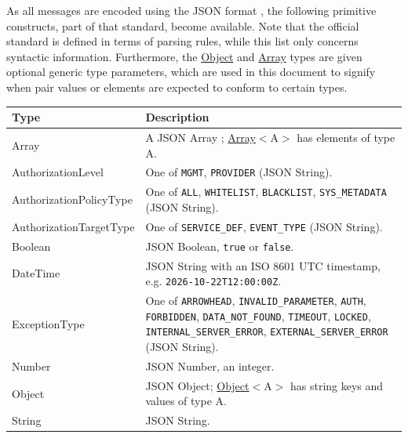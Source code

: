 \documentclass[a4paper]{arrowhead}
\newcommand{\pdef}[1]{{\textcolor{ArrowheadGrey}{#1 \label{sec:model:primitives:#1} \label{sec:model:primitives:#1s}}}}
\newcommand{\pref}[1]{{\textcolor{ArrowheadGrey}{\hyperref[sec:model:primitives:#1]{#1}}}}
\begin{document}
As all messages are encoded using the JSON format \cite{rfc8259}, the following primitive constructs, part of that standard, become available.
Note that the official standard is defined in terms of parsing rules, while this list only concerns syntactic information.
Furthermore, the \pref{Object} and \pref{Array} types are given optional generic type parameters, which are used in this document to signify when pair values or elements are expected to conform to certain types.

\noindent\begin{tabularx}{\textwidth}{| p{4.6cm} | X |} \hline
\rowcolor{gray!33} Type & Description \\ \hline
\pdef{Array} & A JSON Array \cite{rfc8259}; \pref{Array}$<$A$>$ has elements of type A. \\ \hline
\pdef{AuthorizationLevel} & One of \texttt{MGMT}, \texttt{PROVIDER} (JSON String). \\ \hline
\pdef{AuthorizationPolicyType} & One of \texttt{ALL}, \texttt{WHITELIST}, \texttt{BLACKLIST}, \texttt{SYS\_\allowbreak{}METADATA} (JSON String). \\ \hline
\pdef{AuthorizationTargetType} & One of \texttt{SERVICE\_\allowbreak{}DEF}, \texttt{EVENT\_\allowbreak{}TYPE} (JSON String). \\ \hline
\pdef{Boolean} & JSON Boolean, \texttt{true} or \texttt{false}. \\ \hline
\pdef{DateTime} & JSON String with an ISO 8601 UTC timestamp, e.g. \texttt{2026-10-22T12:00:00Z}. \\ \hline
\pdef{ExceptionType} & One of \texttt{ARROWHEAD}, \texttt{INVALID\_\allowbreak{}PARAMETER}, \texttt{AUTH}, \texttt{FORBIDDEN}, \texttt{DATA\_\allowbreak{}NOT\_\allowbreak{}FOUND}, \texttt{TIMEOUT}, \texttt{LOCKED}, \texttt{INTERNAL\_\allowbreak{}SERVER\_\allowbreak{}ERROR}, \texttt{EXTERNAL\_\allowbreak{}SERVER\_\allowbreak{}ERROR} (JSON String). \\ \hline
\pdef{Number} & JSON Number, an integer. \\ \hline
\pdef{Object} & JSON Object; \pref{Object}$<$A$>$ has string keys and values of type A. \\ \hline
\pdef{String} & JSON String. \\ \hline
\end{tabularx}

\newpage




\newpage
\end{document}
